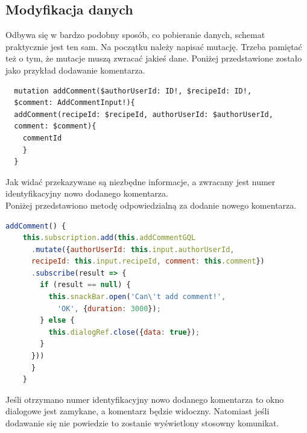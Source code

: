   \subsection{Modyfikacja danych}
  Odbywa się w bardzo podobny sposób, co pobieranie danych, schemat praktycznie jest ten sam. Na początku należy napisać mutację. Trzeba pamiętać też o tym, że mutacje muszą zwracać jakieś dane. Poniżej przedstawione zostało jako przykład dodawanie komentarza.
  \begin{lstlisting}
  mutation addComment($authorUserId: ID!, $recipeId: ID!, 
  $comment: AddCommentInput!){
  addComment(recipeId: $recipeId, authorUserId: $authorUserId,
  comment: $comment){
    commentId
    }
  }
  \end{lstlisting}
  Jak widać przekazywane są niezbędne informacje, a zwracany jest numer identyfikacyjny nowo dodanego komentarza.\\
  Poniżej przedstawiono metodę odpowiedzialną za dodanie nowego komentarza.
  \begin{lstlisting}[language=JavaScript]
   addComment() {
    this.subscription.add(this.addCommentGQL
      .mutate({authorUserId: this.input.authorUserId,
      recipeId: this.input.recipeId, comment: this.comment})
      .subscribe(result => {
        if (result == null) {
          this.snackBar.open('Can\'t add comment!',
            'OK', {duration: 3000});
        } else {
          this.dialogRef.close({data: true});
        }
      }))
      }
    }
  \end{lstlisting}
  Jeśli otrzymano numer identyfikacyjny nowo dodanego komentarza to okno dialogowe jest zamykane, a komentarz będzie widoczny. Natomiast jeśli dodawanie się nie powiedzie to zostanie wyświetlony stosowny komunikat.
